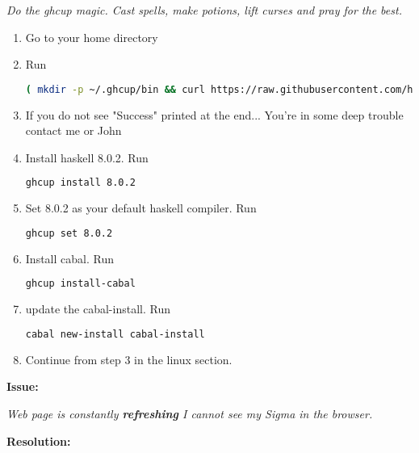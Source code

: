 \documentclass[11pt,a4paper]{article}
\begin{document}
        \textit{Do the ghcup magic. Cast spells, make potions, lift curses and pray for the best.}
        
        \begin{enumerate}
             
        \item Go to your home directory
        \item Run
\begin{lstlisting}[language=Bash,breaklines]
( mkdir -p ~/.ghcup/bin && curl https://raw.githubusercontent.com/haskell/ghcup/master/ghcup > ~/.ghcup/bin/ghcup && chmod +x ~/.ghcup/bin/ghcup) && echo "Success"
\end{lstlisting}
        \item If you do not see "Success" printed at the end... You're in some deep trouble contact me or John
        \item Install haskell 8.0.2. Run 
\begin{lstlisting}[language=Bash]
ghcup install 8.0.2
\end{lstlisting}
        \item Set 8.0.2 as your default haskell compiler. Run
\begin{lstlisting}[language=Bash]
ghcup set 8.0.2
\end{lstlisting}
        
        \item Install cabal. Run
\begin{lstlisting}[language=Bash]
ghcup install-cabal
\end{lstlisting}

        \item update the cabal-install. Run
\begin{lstlisting}[language=Bash]
cabal new-install cabal-install
\end{lstlisting}

        \item Continue from step 3 in the linux section.
        \end{enumerate}

 \textbf{Issue:}
 
 \textit{Web page is constantly \textbf{refreshing} I cannot see my Sigma in the browser.}
 
 \textbf{Resolution:}
 
\end{document}
